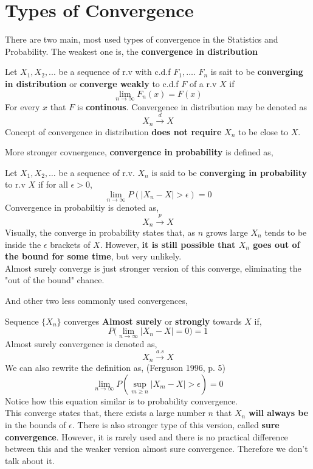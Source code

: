 \section{Types of Convergence}
There are two main, most used types of convergence in the Statistics and Probability. The weakest one is, the \textbf{convergence in distribution}
\begin{definition}
    Let $X_1,X_2, ...$ be a sequence of r.v  with c.d.f $F_1, \ldots $. $F_n$ is sait to be \textbf{converging in distribution} or \textbf{converge weakly} to c.d.f $F$ of a r.v $X$ if
    \[ \lim_{n \rightarrow \infty} F_n(x) = F(x)\]
    For every $x$ that  $F$ is \textbf{continous}. Convergence in distribution may be denoted as 
    \[ X_n \stackrel{d}{\rightarrow} X \]
    Concept of convergence in distribution \textbf{does not require} $X_n$ to be close to $X$. \\
\end{definition}
More stronger covnergence, \textbf{convergence in probability} is defined as,
\begin{definition}
    Let $X_1,X_2, \ldots $ be a sequence of r.v. $X_n$ is said to be \textbf{converging in probability} to r.v $X$ if for all $\epsilon > 0$,
    \[ \lim_{n \rightarrow \infty} P(|X_n - X| > \epsilon) = 0 \]
    Convergence in probabiltiy is denoted as, 
    \[ X_n \stackrel{p}{\rightarrow} X\]
    Visually, the converge in probability states that, as $n$ grows large $X_n$ tends to be inside the $\epsilon$ brackets of $X$. However, \textbf{it is still possible that $X_n$ goes out of the bound for some time}, but very unlikely. \\
    Almost surely converge is just stronger version of this converge, eliminating the "out of the bound" chance.
\end{definition}
And other two less commonly used convergences,
\begin{definition}
    Sequence $\{ X_n \}$  converges \textbf{Almost surely} or \textbf{strongly} towards $X$ if,
    \[ P \biggl( \lim_{n \rightarrow \infty}|X_n - X | = 0 \biggr) = 1\]
    Almost surely convergence is denoted as, 
    \[ X_n \stackrel{a.s}{\rightarrow} X\]
    We can also rewrite the definition as, (Ferguson 1996, p. 5)
    \[ \lim_{n\to\infty} P\left({\sup_{m\geq n}|X_m-X|>\epsilon }\right) = 0\]
Notice how this equation similar is to probability convergence.\\
This converge states that, there exists a large number $n$ that $X_n$ \textbf{will always be} in the bounds of $\epsilon$.
There is also stronger type of this version, called \textbf{sure convergence}. However, it is rarely used and there is no practical difference between this and the weaker version almost sure convergence. Therefore we don't talk about it.\\
\end{definition}
